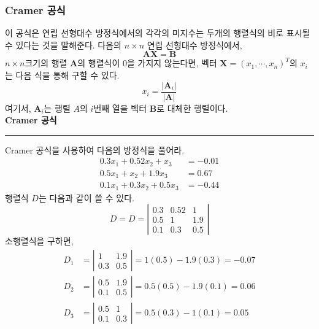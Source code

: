 \subsubsection{Cramer 공식}
이 공식은 연립 선형대수 방정식에서의 각각의 미지수는 두개의 행렬식의 비로 표시될 수 있다는 것을 말해준다. 다음의 $n\times n$ 연립 선형대수 방정식에서,
\begin{equation*}
\mathbf{AX}=\mathbf{B}
\end{equation*}
$n\times n$크기의 행렬 $\mathbf{A}$의 행렬식이 $0$을 가지지 않는다면, 벡터 $\mathbf{X}=(x_{1},\cdots,x_{n})^T$의 $x_{i}$는 다음 식을 통해 구할 수 있다.
\begin{equation}
x_{i}=\frac{\left|\mathbf{A}_{i}\right|}{\left|\mathbf{A}\right|}
\end{equation}
여기서, $\mathbf{A}_{i}$는 행렬 $A$의 $i$번째 열을 벡터 $\mathbf{B}$로 대체한 행렬이다.
\\
 \textbf{Cramer 공식}\\
\rule{\textwidth}{0.1pt}
Cramer 공식을 사용하여 다음의 방정식을 풀어라.
\begin{align*}
0.3x_{1}+0.52x_{2}+x_{3}&=-0.01\\
0.5x_{1}+x_{2}+1.9x_{3}&=0.67\\
0.1x_{1}+0.3x_{2}+0.5x_{3}&=-0.44
\end{align*}
 행렬식 $D$는 다음과 같이 쓸 수 있다.
\begin{equation*}
D=D=\left|\begin{array}{ccc}0.3&0.52&1\\0.5&1&1.9\\0.1&0.3&0.5\end{array}\right|
\end{equation*}
소행렬식을 구하면,
\begin{align*}
D_{1}&=\left|\begin{array}{cc}1&1.9\\0.3&0.5\end{array}\right|=1(0.5)-1.9(0.3)=-0.07\\
D_{2}&=\left|\begin{array}{cc}0.5&1.9\\0.1&0.5\end{array}\right|=0.5(0.5)-1.9(0.1)=0.06\\
D_{3}&=\left|\begin{array}{cc}0.5&1\\0.1&0.3\end{array}\right|=0.5(0.3)-1(0.1)=0.05
\end{align*}
